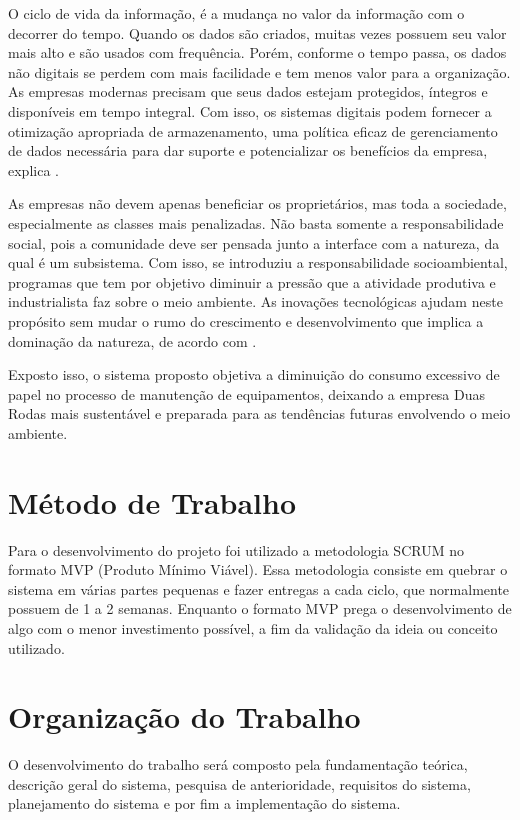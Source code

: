 O ciclo de vida da informação, é a mudança no valor da informação com o decorrer do tempo. Quando os dados são criados, muitas vezes possuem seu valor mais alto e são usados com frequência. Porém, conforme o tempo passa, os dados não digitais se perdem com mais facilidade e tem menos valor para a organização.  As empresas modernas precisam que seus dados estejam protegidos, íntegros e disponíveis em tempo integral. Com isso, os sistemas digitais podem fornecer a otimização apropriada de armazenamento, uma política eficaz de gerenciamento de dados necessária para dar suporte e potencializar os benefícios da empresa, explica \cite{somasundaram2009armazenamento}.

As empresas não devem apenas beneficiar os proprietários, mas toda a sociedade, especialmente as classes mais penalizadas. Não basta somente a responsabilidade social, pois a comunidade deve ser pensada junto a interface com a natureza, da qual é um subsistema. Com isso, se introduziu a responsabilidade socioambiental, programas que tem por objetivo diminuir a pressão que a atividade produtiva e industrialista faz sobre o meio ambiente. As inovações tecnológicas ajudam neste propósito sem mudar o rumo do crescimento e desenvolvimento que implica a dominação da natureza, de acordo com \cite{boff2017sustentabilidade}.

Exposto isso, o sistema proposto objetiva a diminuição do consumo excessivo de papel no processo de manutenção de equipamentos, deixando a empresa Duas Rodas mais sustentável e preparada para as tendências futuras envolvendo o meio ambiente.

\section{Método de Trabalho}
Para o desenvolvimento do projeto foi utilizado a metodologia SCRUM no formato MVP (Produto Mínimo Viável).
Essa metodologia consiste em quebrar o sistema em várias partes pequenas e fazer entregas a cada ciclo, que normalmente possuem de 1 a 2 semanas.
Enquanto o formato MVP prega o desenvolvimento de algo com o menor investimento possível, a fim da validação da ideia ou conceito utilizado.

\section{Organização do Trabalho}

O desenvolvimento do trabalho será composto pela fundamentação teórica, descrição geral do sistema, pesquisa de anterioridade, requisitos do sistema, planejamento do sistema e por fim a implementação do sistema.

